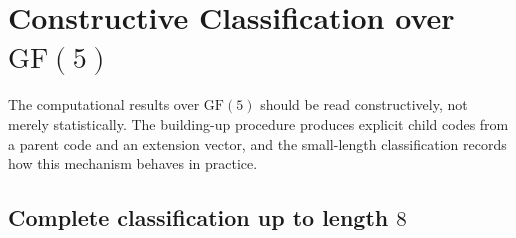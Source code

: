 \documentclass[12pt]{article}
\newcommand{\GF}[1]{\ensuremath{\mathrm{GF}(#1)}}
\begin{document}
\section{Constructive Classification over \texorpdfstring{$\GF{5}$}{GF(5)}}
\label{sec:classification}

The computational results over $\GF{5}$ should be read constructively, not merely statistically. The building-up procedure produces explicit child codes from a parent code and an extension vector, and the small-length classification records how this mechanism behaves in practice.

\subsection{Complete classification up to length $8$}
\end{document}
